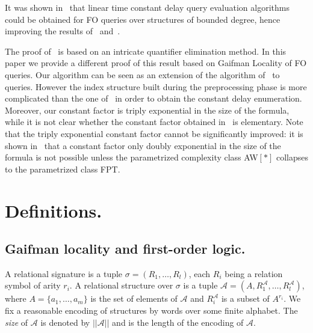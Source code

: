 \documentclass{LMCS}
\newcommand\set[1]{\ensuremath{\{#1\}}\xspace}
\newcommand\cA{\ensuremath{{\mathcal A}}\xspace}
\begin{document}
It was shown in~\cite{DurandGrandjean07} that linear time constant delay query
evaluation algorithms could be obtained for FO queries over structures
of bounded degree, hence improving the results of~\cite{Seese96}
and~\cite{FrickGrohe04}.


The proof of~\cite{DurandGrandjean07} is based on an intricate quantifier
elimination method. In this paper we provide a different proof of this result
based on Gaifman Locality of FO queries. Our algorithm can be seen as an extension
of the algorithm of~\cite{FrickGrohe04} to queries. However the index structure
built during the preprocessing phase is more complicated than the one
of~\cite{FrickGrohe04} in order to obtain the constant delay enumeration.
Moreover, our constant factor is triply exponential in the size of the formula,
while it is not clear whether the constant factor obtained
in~\cite{DurandGrandjean07} is elementary. Note that the triply exponential
constant factor cannot be significantly improved: it is shown
in~\cite{FrickGrohe04} that a constant factor only doubly exponential in the
size of the formula is not possible unless the parametrized complexity class
AW$[*]$ collapses to the parametrized class FPT.

\section{Definitions.}
\subsection{Gaifman locality and first-order logic.}

A relational signature is a tuple $\sigma=(R_{1}, \ldots, R_{l})$, each $R_i$
being a relation symbol of arity $r_i$. A relational structure over $\sigma$ is
a tuple $\cA = \left(A, R^{\cA}_{1}, \ldots, R^{\cA}_{l} \right)$, where $A =
\set{a_{1}, \ldots, a_{m}}$ is the set of elements of \cA and $R^{\cA}_{i}$ is
a subset of $A^{r_{i}}$.
We fix a reasonable encoding of structures by words over some finite
alphabet. The \emph{size} of \cA is denoted by $||\cA||$ and is the length of
the encoding of \cA.
\end{document}
